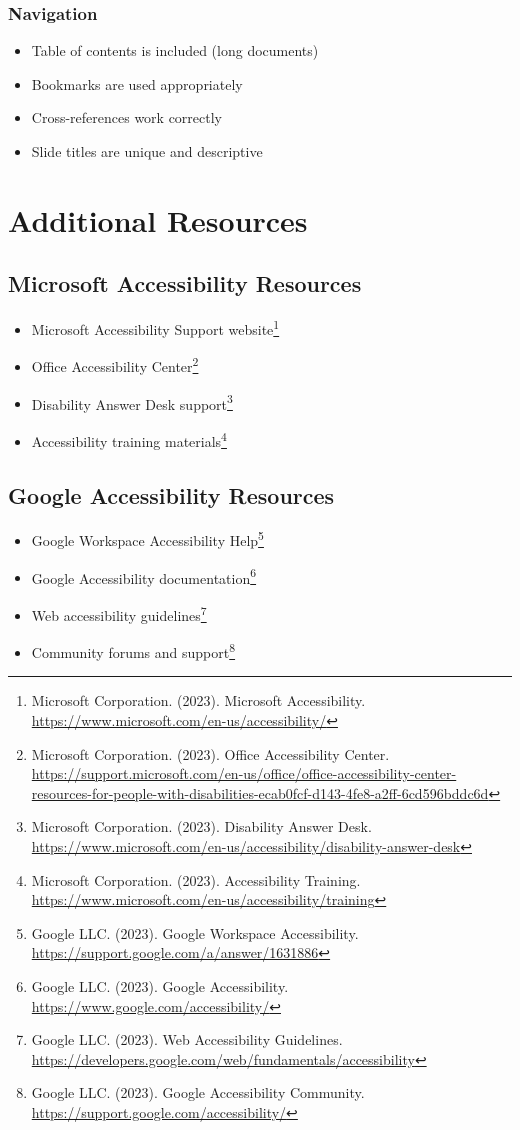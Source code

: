 \subsubsection{Navigation}
\begin{itemize}
\item[\checkmark] Table of contents is included (long documents)
\item[\checkmark] Bookmarks are used appropriately
\item[\checkmark] Cross-references work correctly
\item[\checkmark] Slide titles are unique and descriptive
\end{itemize}

\section{Additional Resources}

\subsection{Microsoft Accessibility Resources}
\begin{itemize}
\item Microsoft Accessibility Support website\footnote{Microsoft Corporation. (2023). Microsoft Accessibility. \url{https://www.microsoft.com/en-us/accessibility/}}
\item Office Accessibility Center\footnote{Microsoft Corporation. (2023). Office Accessibility Center. \url{https://support.microsoft.com/en-us/office/office-accessibility-center-resources-for-people-with-disabilities-ecab0fcf-d143-4fe8-a2ff-6cd596bddc6d}}
\item Disability Answer Desk support\footnote{Microsoft Corporation. (2023). Disability Answer Desk. \url{https://www.microsoft.com/en-us/accessibility/disability-answer-desk}}
\item Accessibility training materials\footnote{Microsoft Corporation. (2023). Accessibility Training. \url{https://www.microsoft.com/en-us/accessibility/training}}
\end{itemize}

\subsection{Google Accessibility Resources}
\begin{itemize}
\item Google Workspace Accessibility Help\footnote{Google LLC. (2023). Google Workspace Accessibility. \url{https://support.google.com/a/answer/1631886}}
\item Google Accessibility documentation\footnote{Google LLC. (2023). Google Accessibility. \url{https://www.google.com/accessibility/}}
\item Web accessibility guidelines\footnote{Google LLC. (2023). Web Accessibility Guidelines. \url{https://developers.google.com/web/fundamentals/accessibility}}
\item Community forums and support\footnote{Google LLC. (2023). Google Accessibility Community. \url{https://support.google.com/accessibility/}}
\end{itemize}

